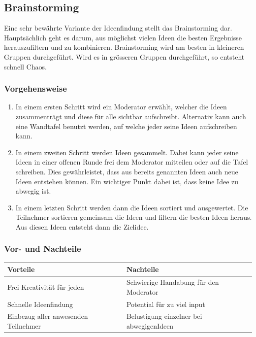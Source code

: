 \subsection{Brainstorming}\label{subsec:Brainstorming}

Eine sehr bewährte Variante der Ideenfindung stellt das Brainstorming dar. Hauptsächlich geht es darum, aus möglichst vielen Ideen die besten Ergebnisse herauszufiltern und zu kombinieren. Brainstorming wird am besten in kleineren Gruppen durchgeführt. Wird es in grösseren Gruppen durchgeführt, so entsteht schnell Chaos.

\subsubsection{Vorgehensweise}

\begin{enumerate}
\item In einem ersten Schritt wird ein Moderator erwählt, welcher die Ideen zusammenträgt und diese für alle sichtbar aufschreibt. Alternativ kann auch eine Wandtafel benutzt werden, auf welche jeder seine Ideen aufschreiben kann.
\item In einem zweiten Schritt werden Ideen gesammelt. Dabei kann jeder seine Ideen in einer offenen Runde frei dem Moderator mitteilen oder auf die Tafel schreiben. Dies gewährleistet, dass aus bereits genannten Ideen auch neue Ideen entstehen können. Ein wichtiger Punkt dabei ist, dass keine Idee zu abwegig ist.
\item In einem letzten Schritt werden dann die Ideen sortiert und ausgewertet. Die Teilnehmer sortieren gemeinsam die Ideen und filtern die besten Ideen heraus. Aus diesen Ideen entsteht dann die Zielidee. 

\end{enumerate}
\subsubsection{Vor- und Nachteile}

\begin{tabular}{|l|l|}
	\hline 
	\textbf{Vorteile} & \textbf{Nachteile} \\ 
	\hline 
	Frei Kreativität für jeden & Schwierige Handabung für den Moderator  \\
	\hline 
	Schnelle Ideenfindung & Potential für zu viel input \\ 
	\hline 
	Einbezug aller anwesenden Teilnehmer & Belustigung einzelner bei \flqq abwegigen\frqq  Ideen\\
	\hline
\end{tabular} 


